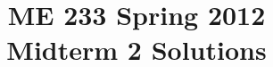 \documentclass[letterpaper,10pt]{article}
\begin{document}
\thispagestyle{empty}

\title{\bf ME 233 Spring 2012 \\ Midterm 2 Solutions}
\date{}
\maketitle






\end{document}
